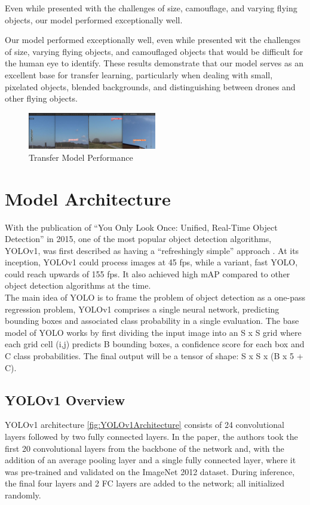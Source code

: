 \documentclass[10pt,twocolumn,letterpaper]{article}
\begin{document}
Even while presented with the challenges of size, camouflage, and varying flying objects, our model performed exceptionally well.

Our model performed exceptionally well, even while presented wit the challenges of size, varying flying objects, and camouflaged objects that would be difficult for the human eye to identify. These results demonstrate that our model serves as an excellent base for transfer learning, particularly when dealing with small, pixelated objects, blended backgrounds, and distinguishing between drones and other flying objects.

\begin{figure}[h]
    \centering
    \includegraphics[width=0.5\textwidth]{figures/transfer_model.png}
    \caption{Transfer Model Performance \cite{Yolov5Arch}}
    \label{fig:Transfer Model Performance}
\end{figure}


\section{Model Architecture}
With the publication of “You Only Look Once: Unified, Real-Time Object Detection” \cite{YOLO_OG} in 2015, one of the most popular object detection algorithms, YOLOv1, was first described as having a “refreshingly simple” approach \cite{CompReview}. At its inception, YOLOv1 could process images at 45 fps, while a variant, fast YOLO, could reach upwards of 155 fps. It also achieved high mAP compared to other object detection algorithms at the time.\\
\indent The main idea of YOLO is to frame the problem of object detection as a one-pass regression problem, YOLOv1 comprises a single neural network, predicting bounding boxes and associated class probability in a single evaluation. The base model of YOLO works by first dividing the input image into an S x S grid where each grid cell (i,j) predicts B bounding boxes, a confidence score for each box and C class probabilities. The final output will be a tensor of shape: S x S x (B x 5 + C).

\subsection{YOLOv1 Overview}
YOLOv1 architecture \ref{fig:YOLOv1Architecture} consists of 24 convolutional layers followed by two fully connected layers. In the paper, the authors took the first 20 convolutional layers from the backbone of the network and, with the addition of an average pooling layer and a single fully connected layer, where it was pre-trained and validated on the ImageNet 2012 dataset. During inference, the final four layers and 2 FC layers are added to the network; all initialized randomly.
\end{document}
